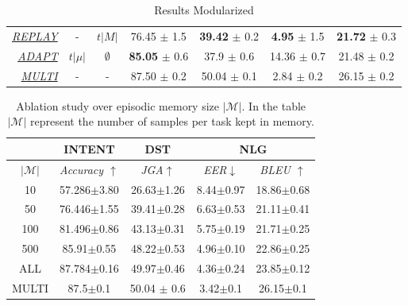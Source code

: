 \documentclass[11pt,a4paper]{article}
\begin{document}
\begin{table}[t]
\begin{tabular}{r|cc|c|c|cc}
{\ul \textit{REPLAY}}                & -           & $t|M|$                & 76.45 $\pm$ 1.5              & \textbf{39.42} $\pm$ 0.2         & \textbf{4.95} $\pm$ 1.5            & \textbf{21.72} $\pm$ 0.3          \\
{\ul \textit{ADAPT}}                 & $t|\mu|$    & $\emptyset$           & \textbf{85.05} $\pm$ 0.6              & 37.9  $\pm$ 0.6         & 14.36 $\pm$ 0.7           & 21.48 $\pm$ 0.2          \\ \hline
{\ul \textit{MULTI}}                 & -           & -                     & 87.50 $\pm$ 0.2              & 50.04 $\pm$ 0.1         & 2.84 $\pm$ 0.2            & 26.15 $\pm$ 0.2          \\ \hline
\end{tabular}
    \caption{Results Modularized}
    \label{tab:modularized_results}
\end{table}

\begin{table}[t]
\centering
\begin{tabular}{c|c|c|cc}
\hline
                & \textbf{INTENT}              & \textbf{DST}           & \multicolumn{2}{c}{\textbf{NLG}}                    \\ \hline
$|\mathcal{M}|$ & \textit{Accuracy $\uparrow$} & \textit{JGA$\uparrow$} & \textit{EER$\downarrow$} & \textit{BLEU $\uparrow$} \\ \hline
10              & 57.286$\pm$3.80              & 26.63$\pm$1.26         & 8.44$\pm$0.97            & 18.86$\pm$0.68           \\
50              & 76.446$\pm$1.55              & 39.41$\pm$0.28         & 6.63$\pm$0.53            & 21.11$\pm$0.41           \\
100             & 81.496$\pm$0.86              & 43.13$\pm$0.31         & 5.75$\pm$0.19            & 21.71$\pm$0.25           \\
500             & 85.91$\pm$0.55               & 48.22$\pm$0.53         & 4.96$\pm$0.10            & 22.86$\pm$0.25           \\
ALL             & 87.784$\pm$0.16              & 49.97$\pm$0.46         & 4.36$\pm$0.24            & 23.85$\pm$0.12           \\ \hline
MULTI           & 87.5$\pm$0.1                 & 50.04 $\pm$ 0.6        & 3.42$\pm$0.1             & 26.15$\pm$0.1            \\ \hline
\end{tabular}
    \caption{Ablation study over episodic memory size $|\mathcal{M}|$. In the table $|\mathcal{M}|$ represent the number of samples per task kept in memory. }
    \label{tab:ablationmem}
\end{table}
\end{document}

